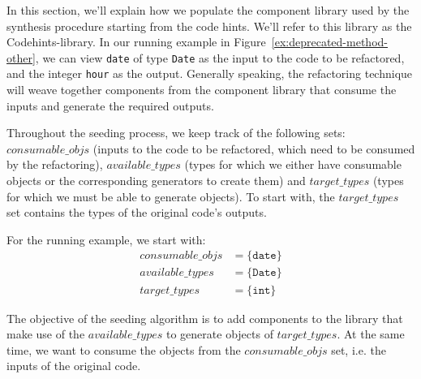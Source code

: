 \documentclass[10pt,conference]{IEEEtran}
\begin{document}
In this section, we'll explain how we populate the component library used by the synthesis procedure starting from the code hints. We'll refer to this library as the Codehints-library.
In our running example in Figure~\ref{ex:deprecated-method-other}, we can view \texttt{date} of type \texttt{Date} as the input to the code to be refactored, and the integer \texttt{hour} as the output. Generally speaking, the refactoring technique will weave together components from the component library that consume the inputs and generate the required outputs.

Throughout the seeding process, we keep track of the following sets:
$consumable\_ objs$ (inputs to the code to be refactored, which need to be consumed by the refactoring),  
$available\_types$ (types for which we either have consumable objects or the corresponding generators to create them) and 
$target\_types$ (types for which we must be able to generate objects). To start with, the $target\_types$ set
contains the types of the original code's outputs. %

For the running example, we start with:
\[
\begin{aligned}
  consumable\_objs &=  \{\texttt{date}\}\\  
  available\_types &=  \{\texttt{Date}\}\\
  target\_types &= \{\texttt{int}\}
\end{aligned}
\]

%

The objective of the seeding algorithm is to
add components to the library that make use of the $available\_types$ to generate objects
of $target\_types$. At the same time, we want to consume the objects from the
$consumable\_objs$ set, i.e. the inputs of the original code.
\end{document}
